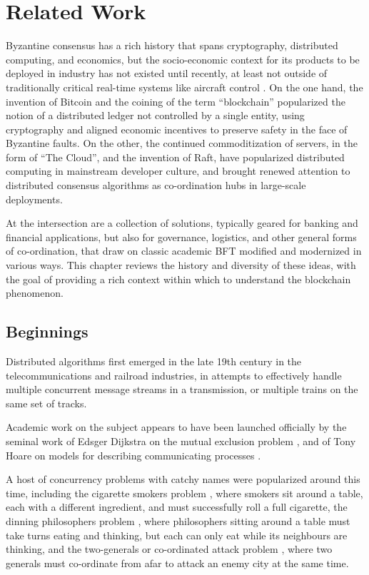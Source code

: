 \chapter{Related Work}
\label{ch:related}

Byzantine consensus has a rich history that spans cryptography, distributed computing, and economics,
but the socio-economic context for its products to be deployed in industry has not existed until recently,
at least not outside of traditionally critical real-time systems like aircraft control \cite{draper_lab}.
On the one hand, the invention of Bitcoin and the coining of the term ``blockchain'' popularized the notion
of a distributed ledger not controlled by a single entity, using cryptography and aligned economic incentives to 
preserve safety in the face of Byzantine faults.
On the other, the continued commoditization of servers, in the form of ``The Cloud'', and the invention of Raft, 
have popularized distributed computing in mainstream developer culture, 
and brought renewed attention to distributed consensus algorithms as co-ordination hubs in large-scale deployments. 

At the intersection are a collection of solutions, typically geared for banking and financial applications,
but also for governance, logistics, and other general forms of co-ordination, 
that draw on classic academic BFT modified and modernized in various ways.
This chapter reviews the history and diversity of these ideas, with the goal of providing a rich context within which to 
understand the blockchain phenomenon.

\section{Beginnings}

Distributed algorithms first emerged in the late 19th century in the telecommunications and railroad industries,
in attempts to effectively handle multiple concurrent message streams in a transmission, 
or multiple trains on the same set of tracks.

Academic work on the subject appears to have been launched officially by the seminal work
of Edsger Dijkstra on the mutual exclusion problem \cite{mutex}, and
of Tony Hoare on models for describing communicating processes \cite{csp}.

A host of concurrency problems with catchy names were popularized around this time,
including the cigarette smokers problem \cite{cigarette_smokers}, where smokers sit around a table, 
each with a different ingredient, and must successfully roll a full cigarette,
the dinning philosophers problem \cite{dining_philosophers},
where philosophers sitting around a table must take turns eating and thinking,
but each can only eat while its neighbours are thinking,
and the two-generals or co-ordinated attack problem \cite{gettier},
where two generals must co-ordinate from afar to attack an enemy city at the same time.

